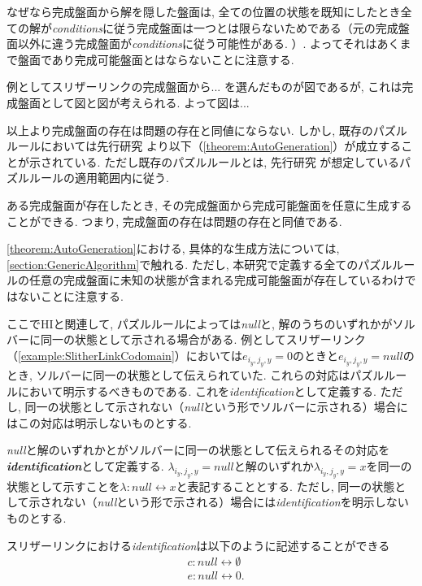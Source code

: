 なぜなら完成盤面から解を隠した盤面は, 全ての位置の状態を既知にしたとき全ての解が\textit{conditions}に従う完成盤面は一つとは限らないためである（元の完成盤面以外に違う完成盤面が\textit{conditions}に従う可能性がある. ）. よってそれはあくまで盤面であり完成可能盤面とはならないことに注意する.
\begin{example}
  例としてスリザーリンクの完成盤面から... を選んだものが図であるが, これは完成盤面として図と図が考えられる. よって図は...
\end{example}
以上より完成盤面の存在は問題の存在と同値にならない. しかし, 既存のパズルルールにおいては先行研究 \cite{Fujiwara2022}より以下（\cref{theorem:AutoGeneration}）が成立することが示されている. ただし既存のパズルルールとは, 先行研究 \cite{Fujiwara2022}が想定しているパズルルールの適用範囲内に従う.
\begin{theorem}\label{theorem:AutoGeneration}
  ある完成盤面が存在したとき, その完成盤面から完成可能盤面を任意に生成することができる. つまり, 完成盤面の存在は問題の存在と同値である.
\end{theorem}
\cref{theorem:AutoGeneration}における, 具体的な生成方法については, \cref{section:GenericAlgorithm}で触れる. ただし, 本研究で定義する全てのパズルルールの任意の完成盤面に未知の状態が含まれる完成可能盤面が存在しているわけではないことに注意する.

ここでHIと関連して, パズルルールによっては\textit{null}と, 解のうちのいずれかがソルバーに同一の状態として示される場合がある. 例としてスリザーリンク（\cref{example:SlitherLinkCodomain}）においては$e_{i_y,j_y,y} = 0$のときと$e_{i_y,j_y,y}=\textit{null}$のとき, ソルバーに同一の状態として伝えられていた. これらの対応はパズルルールにおいて明示するべきものである. これを\textit{identification}として定義する. ただし, 同一の状態として示されない（\textit{null}という形でソルバーに示される）場合にはこの対応は明示しないものとする.

\begin{definition}\label{definition:Identification}
  \textit{null}と解のいずれかとがソルバーに同一の状態として伝えられるその対応を\textbf{\textit{identification}}として定義する.
  $\lambda_{i_y,j_y,y}=\textit{null}$と解のいずれか$\lambda_{i_y,j_y,y}=x$を同一の状態として示すことを$\lambda\colon\textit{null}\leftrightarrow x$と表記することとする.
  ただし, 同一の状態として示されない（\textit{null}という形で示される）場合には\textit{identification}を明示しないものとする.
\end{definition}

\begin{example}\label{example:SlitherLinkIndentification}
  スリザーリンクにおける\textit{identification}は以下のように記述することができる
  \begin{align}
     & c\colon\textit{null}\leftrightarrow\emptyset \\
     & e\colon\textit{null}\leftrightarrow 0.
  \end{align}
\end{example}


